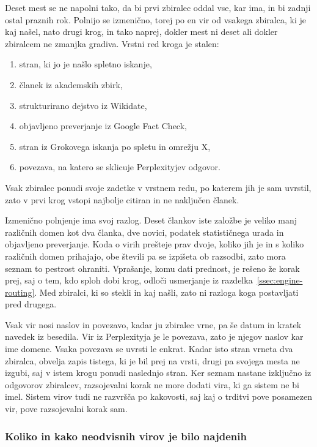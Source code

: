 \documentclass[a4paper, 12pt]{book}
\begin{document}
Deset mest se ne napolni tako, da bi prvi zbiralec oddal vse, kar ima, in bi
zadnji ostal praznih rok. Polnijo se izmenično, torej po en vir od vsakega
zbiralca, ki je kaj našel, nato drugi krog, in tako naprej, dokler mest ni deset
ali dokler zbiralcem ne zmanjka gradiva. Vrstni red kroga je stalen:

\begin{enumerate}\itemsep2pt
\item stran, ki jo je našlo spletno iskanje,
\item članek iz akademskih zbirk,
\item strukturirano dejstvo iz Wikidate,
\item objavljeno preverjanje iz Google Fact Check,
\item stran iz Grokovega iskanja po spletu in omrežju X,
\item povezava, na katero se sklicuje Perplexityjev odgovor.
\end{enumerate}

Vsak zbiralec ponudi svoje zadetke v vrstnem redu, po katerem jih je sam
uvrstil, zato v prvi krog vstopi najbolje citiran in ne naključen članek.

Izmenično polnjenje ima svoj razlog. Deset člankov iste založbe je veliko manj
različnih domen kot dva članka, dve novici, podatek statističnega urada in
objavljeno preverjanje. Koda o virih prešteje prav dvoje, koliko jih je in s
koliko različnih domen prihajajo, obe števili pa se izpišeta ob razsodbi, zato
mora seznam to pestrost ohraniti. Vprašanje, komu dati prednost, je rešeno že
korak prej, saj o tem, kdo sploh dobi krog, odloči usmerjanje iz
razdelka~\ref{ssec:engine-routing}. Med zbiralci, ki so stekli in kaj našli,
zato ni razloga koga postavljati pred drugega.

Vsak vir nosi naslov in povezavo, kadar ju zbiralec vrne, pa še datum in kratek
navedek iz besedila. Vir iz Perplexityja je le povezava, zato je njegov naslov
kar ime domene. Vsaka povezava se uvrsti le enkrat. Kadar isto stran vrneta dva
zbiralca, obvelja zapis tistega, ki je bil prej na vrsti, drugi pa svojega mesta
ne izgubi, saj v istem krogu ponudi naslednjo stran. Ker seznam nastane
izključno iz odgovorov zbiralcev, razsojevalni korak ne more dodati vira, ki ga
sistem ne bi imel. Sistem virov tudi ne razvršča po kakovosti, saj kaj o trditvi
pove posamezen vir, pove razsojevalni korak sam.

\subsubsection{Koliko in kako neodvisnih virov je bilo najdenih}
\label{ssec:neodvisnost}
\end{document}
